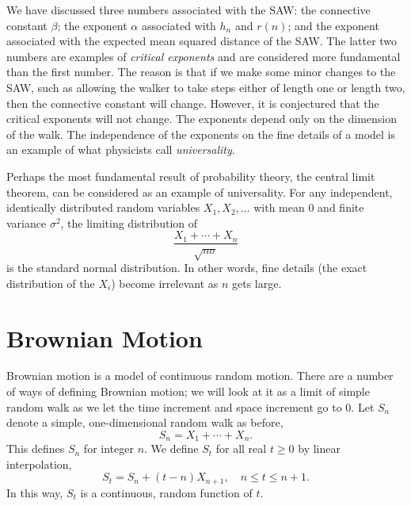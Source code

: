 \documentclass{stml-l}
\theoremstyle{definition}
\numberwithin{equation}{chapter}
\numberwithin{figure}{chapter}
\numberwithin{figure}{section}
\begin{document}
We have discussed three numbers associated with the SAW: the
connective constant $\beta$; the exponent $\alpha$ associated with
$h_{n}$ and $r(n)$; and the exponent associated with the expected
mean squared distance of the SAW. The latter two numbers are
examples of \emph{critical exponents} and are considered more
fundamental than the first number. The reason is that if we make
some minor changes to the SAW, such as allowing the walker to take
steps either of length one or length two, then the connective
constant will change. However, it is conjectured that the critical
exponents will not change. The exponents depend only on the
dimension of the walk. The independence of the exponents on the fine
details of a model is an example of what physicists call
\emph{universality}.

Perhaps the most fundamental result of probability theory, the
central limit theorem, can be considered as an example of
universality. For any independent, identically distributed random
variables $X_{1},X_{2},\ldots$ with mean $0$ and finite variance
$\sigma^{2}$, the limiting distribution of
\begin{equation*}
\frac{X_{1}+\cdots+X_{n}}{\sqrt{n\sigma}}
\end{equation*}
is the standard normal distribution. In other words, fine details
(the exact distribution of the $X_{i}$) become irrelevant as $n$
gets large.

\chapter{Brownian Motion\label{ch04:chap04}}

Brownian motion is a model of continuous random motion. There are a
number of ways of defining Brownian motion; we will look at it as a
limit of simple random walk as we let the time increment and space
increment go to $0$. Let $S_{n}$ denote a simple, one-dimensional
random walk as before,
\begin{equation*}
S_{n}=X_{1}+\cdots+X_{n}.
\end{equation*}
This defines $S_{n}$ for integer $n$. We define $S_{t}$ for all real
$t\geq 0$ by linear interpolation,
\begin{equation*}
S_{t}=S_{n}+(t-n)X_{n+1},\quad n\leq t\leq n+1.
\end{equation*}
In this way, $S_{t}$ is a continuous, random function of $t$.
\end{document}
